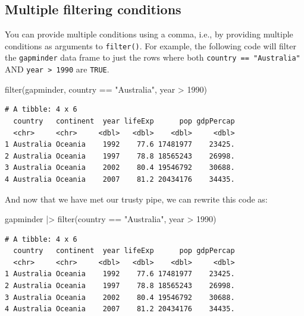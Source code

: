 \documentclass[
  letterpaper,
  DIV=11,
  numbers=noendperiod]{scrreprt}
\newenvironment{Shaded}{\begin{snugshade}}{\end{snugshade}}
\newcommand{\DecValTok}[1]{\textcolor[rgb]{0.68,0.00,0.00}{#1}}
\newcommand{\FunctionTok}[1]{\textcolor[rgb]{0.28,0.35,0.67}{#1}}
\newcommand{\NormalTok}[1]{\textcolor[rgb]{0.00,0.23,0.31}{#1}}
\newcommand{\SpecialCharTok}[1]{\textcolor[rgb]{0.37,0.37,0.37}{#1}}
\newcommand{\StringTok}[1]{\textcolor[rgb]{0.13,0.47,0.30}{#1}}
\begin{document}
\subsection{Multiple filtering
conditions}\label{multiple-filtering-conditions}

You can provide multiple conditions using a comma, i.e., by providing
multiple conditions as arguments to \texttt{filter()}. For example, the
following code will filter the \texttt{gapminder} data frame to just the
rows where both \texttt{country\ ==\ "Australia"} AND
\texttt{year\ \textgreater{}\ 1990} are \texttt{TRUE}.

\begin{Shaded}
\begin{Highlighting}[]
\FunctionTok{filter}\NormalTok{(gapminder, country }\SpecialCharTok{==} \StringTok{"Australia"}\NormalTok{, year }\SpecialCharTok{\textgreater{}} \DecValTok{1990}\NormalTok{)}
\end{Highlighting}
\end{Shaded}

\begin{verbatim}
# A tibble: 4 x 6
  country   continent  year lifeExp      pop gdpPercap
  <chr>     <chr>     <dbl>   <dbl>    <dbl>     <dbl>
1 Australia Oceania    1992    77.6 17481977    23425.
2 Australia Oceania    1997    78.8 18565243    26998.
3 Australia Oceania    2002    80.4 19546792    30688.
4 Australia Oceania    2007    81.2 20434176    34435.
\end{verbatim}

And now that we have met our trusty pipe, we can rewrite this code as:

\begin{Shaded}
\begin{Highlighting}[]
\NormalTok{gapminder }\SpecialCharTok{|\textgreater{}} \FunctionTok{filter}\NormalTok{(country }\SpecialCharTok{==} \StringTok{"Australia"}\NormalTok{, year }\SpecialCharTok{\textgreater{}} \DecValTok{1990}\NormalTok{)}
\end{Highlighting}
\end{Shaded}

\begin{verbatim}
# A tibble: 4 x 6
  country   continent  year lifeExp      pop gdpPercap
  <chr>     <chr>     <dbl>   <dbl>    <dbl>     <dbl>
1 Australia Oceania    1992    77.6 17481977    23425.
2 Australia Oceania    1997    78.8 18565243    26998.
3 Australia Oceania    2002    80.4 19546792    30688.
4 Australia Oceania    2007    81.2 20434176    34435.
\end{verbatim}
\end{document}
